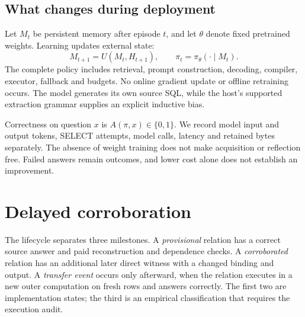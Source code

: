 \documentclass[10pt,twocolumn]{article}
\begin{document}
\subsection{What changes during deployment}
Let $M_t$ be persistent memory after episode $t$, and let $\theta$ denote fixed
pretrained weights. Learning updates external state:
\begin{equation}
M_{t+1}=U(M_t,H_{t+1}),\qquad \pi_t=\pi_\theta(\cdot\mid M_t).
\end{equation}
The complete policy includes retrieval, prompt construction, decoding, compiler,
executor, fallback and budgets. No online gradient update or offline retraining
occurs. The model generates its own source SQL, while the host's supported
extraction grammar supplies an explicit inductive bias.

Correctness on question $x$ is $A(\pi,x)\in\{0,1\}$. We record model input and
output tokens, SELECT attempts, model calls, latency and retained bytes
separately. The absence of weight training does not make acquisition or
reflection free. Failed answers remain outcomes, and lower cost alone does not
establish an improvement.

\section{Delayed corroboration}
The lifecycle separates three milestones. A \emph{provisional} relation has a
correct source answer and paid reconstruction and dependence checks. A
\emph{corroborated} relation has an additional later direct witness with a changed
binding and output. A \emph{transfer event} occurs only afterward, when the
relation executes in a new outer computation on fresh rows and answers
correctly. The first two are implementation states; the third is an empirical
classification that requires the execution audit.
\end{document}
